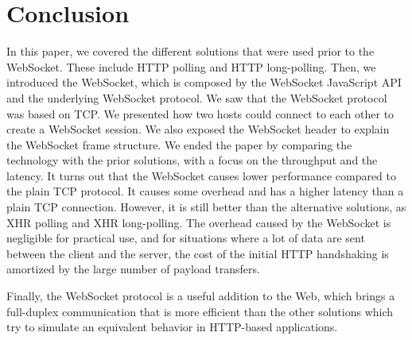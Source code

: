 \documentclass[10pt,journal,compsoc]{IEEEtran}
\newcommand{\ws}{WebSocket}
\begin{document}
\section{Conclusion}
In this paper, we covered the different solutions that were used prior to the \ws{}.
These include HTTP polling and HTTP long-polling.
Then, we introduced the \ws{}, which is composed by the \ws{} JavaScript API and the underlying \ws{} protocol.
We saw that the \ws{} protocol was based on TCP.
We presented how two hosts could connect to each other to create a \ws{} session.
We also exposed the \ws{} header to explain the \ws{} frame structure.
We ended the paper by comparing the technology with the prior solutions, with a focus on the throughput and the latency.
It turns out that the \ws{} causes lower performance compared to the plain TCP protocol.
It causes some overhead and has a higher latency than a plain TCP connection.
However, it is still better than the alternative solutions, as XHR polling and XHR long-polling.
The overhead caused by the \ws{} is negligible for practical use, and for situations where a lot of data are sent between the client and the server, the cost of the initial HTTP handshaking is amortized by the large number of payload transfers.


Finally, the \ws{} protocol is a useful addition to the Web, which brings a full-duplex communication that is more efficient than the other solutions which try to simulate an equivalent behavior in HTTP-based applications.

\ifCLASSOPTIONcaptionsoff
  \newpage
\fi




\end{document}
